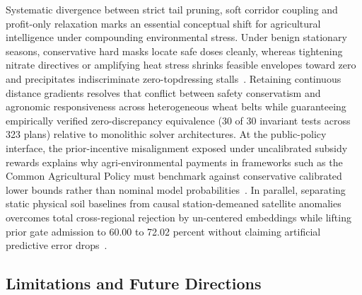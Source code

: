 \documentclass[11pt,a4paper]{article}
\begin{document}
Systematic divergence between strict tail pruning, soft corridor coupling and profit-only relaxation marks an essential conceptual shift for agricultural intelligence under compounding environmental stress. Under benign stationary seasons, conservative hard masks locate safe doses cleanly, whereas tightening nitrate directives or amplifying heat stress shrinks feasible envelopes toward zero and precipitates indiscriminate zero-topdressing stalls~\citep{baja2025}. Retaining continuous distance gradients resolves that conflict between safety conservatism and agronomic responsiveness across heterogeneous wheat belts while guaranteeing empirically verified zero-discrepancy equivalence (30 of 30 invariant tests across 323 plans) relative to monolithic solver architectures. At the public-policy interface, the prior-incentive misalignment exposed under uncalibrated subsidy rewards explains why agri-environmental payments in frameworks such as the Common Agricultural Policy must benchmark against conservative calibrated lower bounds rather than nominal model probabilities~\citep{klages2020}. In parallel, separating static physical soil baselines from causal station-demeaned satellite anomalies overcomes total cross-regional rejection by un-centered embeddings while lifting prior gate admission to 60.00 to 72.02 percent without claiming artificial predictive error drops~\citep{brown2025}.

\subsection{Limitations and Future Directions}
\end{document}
